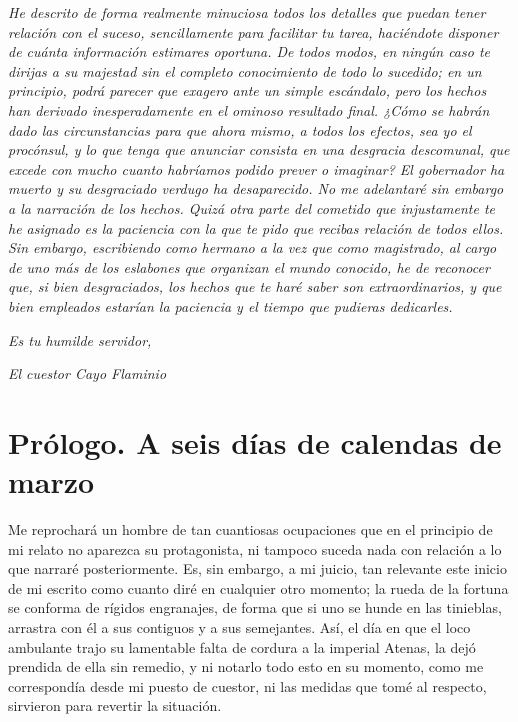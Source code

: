 \documentclass[11pt,openany]{book}
\begin{document}
\textit{He descrito de forma realmente minuciosa todos los detalles que puedan tener relación con el suceso, sencillamente para facilitar tu tarea, haciéndote disponer de cuánta información estimares oportuna. De todos modos, en ningún caso te dirijas a su majestad sin el completo conocimiento de todo lo sucedido; en un principio, podrá parecer que exagero ante un simple escándalo, pero los hechos han derivado inesperadamente en el ominoso resultado final. ¿Cómo se habrán dado las circunstancias para que ahora mismo, a todos los efectos, sea yo el procónsul, y lo que tenga que anunciar consista en una desgracia descomunal, que excede con mucho cuanto habríamos podido prever o imaginar? El gobernador ha muerto y su desgraciado verdugo ha desaparecido. No me adelantaré sin embargo a la narración de los hechos. Quizá otra parte del cometido que injustamente te he asignado es la paciencia con la que te pido que recibas relación de todos ellos. Sin embargo, escribiendo como hermano a la vez que como magistrado, al cargo de uno más de los eslabones que organizan el mundo conocido, he de reconocer que, si bien desgraciados, los hechos que te haré saber son extraordinarios, y que bien empleados estarían la paciencia y el tiempo que pudieras dedicarles.}

\textit{Es tu humilde servidor, }

\textit{El cuestor Cayo Flaminio}

\chapter*{Prólogo. A seis días de calendas de marzo}

Me reprochará un hombre de tan cuantiosas ocupaciones que en el principio de mi relato no aparezca su protagonista, ni tampoco suceda nada con relación a lo que narraré posteriormente. Es, sin embargo, a mi juicio, tan relevante este inicio de mi escrito como cuanto diré en cualquier otro momento; la rueda de la fortuna se conforma de rígidos engranajes, de forma que si uno se hunde en las tinieblas, arrastra con él a sus contiguos y a sus semejantes. Así, el día en que el loco ambulante trajo su lamentable falta de cordura a la imperial Atenas, la dejó prendida de ella sin remedio, y ni notarlo todo esto en su momento, como me correspondía desde mi puesto de cuestor, ni las medidas que tomé al respecto, sirvieron para revertir la situación. 
\end{document}

